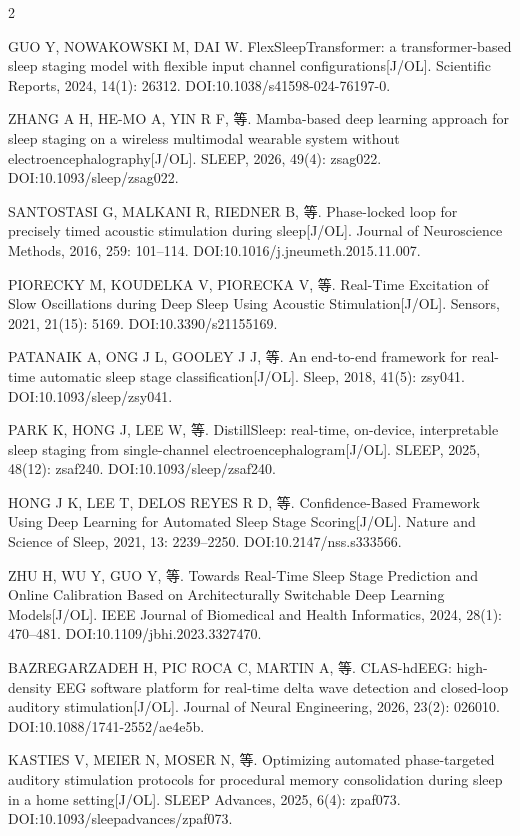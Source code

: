 \documentclass[UTF8,zihao=5,fontset=none]{ctexart}
\begin{document}
\begin{multicols}{2}
{\makebox[25.2pt][l]{[28]}GUO Y, NOWAKOWSKI M, DAI W. FlexSleepTransformer: a transformer-based sleep staging model with flexible input channel configurations[J/OL]. Scientific Reports, 2024, 14(1): 26312. DOI:10.1038/s41598-024-76197-0.\par
\makebox[25.2pt][l]{[29]}ZHANG A H, HE-MO A, YIN R F, 等. Mamba-based deep learning approach for sleep staging on a wireless multimodal wearable system without electroencephalography[J/OL]. SLEEP, 2026, 49(4): zsag022. DOI:10.1093/sleep/zsag022.\par
\makebox[25.2pt][l]{[30]}SANTOSTASI G, MALKANI R, RIEDNER B, 等. Phase-locked loop for precisely timed acoustic stimulation during sleep[J/OL]. Journal of Neuroscience Methods, 2016, 259: 101--114. DOI:10.1016/j.jneumeth.2015.11.007.\par
\makebox[25.2pt][l]{[31]}PIORECKY M, KOUDELKA V, PIORECKA V, 等. Real-Time Excitation of Slow Oscillations during Deep Sleep Using Acoustic Stimulation[J/OL]. Sensors, 2021, 21(15): 5169. DOI:10.3390/s21155169.\par
\makebox[25.2pt][l]{[32]}PATANAIK A, ONG J L, GOOLEY J J, 等. An end-to-end framework for real-time automatic sleep stage classification[J/OL]. Sleep, 2018, 41(5): zsy041. DOI:10.1093/sleep/zsy041.\par
\makebox[25.2pt][l]{[33]}PARK K, HONG J, LEE W, 等. DistillSleep: real-time, on-device, interpretable sleep staging from single-channel electroencephalogram[J/OL]. SLEEP, 2025, 48(12): zsaf240. DOI:10.1093/sleep/zsaf240.\par
\makebox[25.2pt][l]{[34]}HONG J K, LEE T, DELOS REYES R D, 等. Confidence-Based Framework Using Deep Learning for Automated Sleep Stage Scoring[J/OL]. Nature and Science of Sleep, 2021, 13: 2239--2250. DOI:10.2147/nss.s333566.\par
\makebox[25.2pt][l]{[35]}ZHU H, WU Y, GUO Y, 等. Towards Real-Time Sleep Stage Prediction and Online Calibration Based on Architecturally Switchable Deep Learning Models[J/OL]. IEEE Journal of Biomedical and Health Informatics, 2024, 28(1): 470--481. DOI:10.1109/jbhi.2023.3327470.\par
\makebox[25.2pt][l]{[36]}BAZREGARZADEH H, PIC ROCA C, MARTIN A, 等. CLAS-hdEEG: high-density EEG software platform for real-time delta wave detection and closed-loop auditory stimulation[J/OL]. Journal of Neural Engineering, 2026, 23(2): 026010. DOI:10.1088/1741-2552/ae4e5b.\par
\makebox[25.2pt][l]{[37]}KASTIES V, MEIER N, MOSER N, 等. Optimizing automated phase-targeted auditory stimulation protocols for procedural memory consolidation during sleep in a home setting[J/OL]. SLEEP Advances, 2025, 6(4): zpaf073. DOI:10.1093/sleepadvances/zpaf073.\par
}
\end{multicols}
\end{document}

